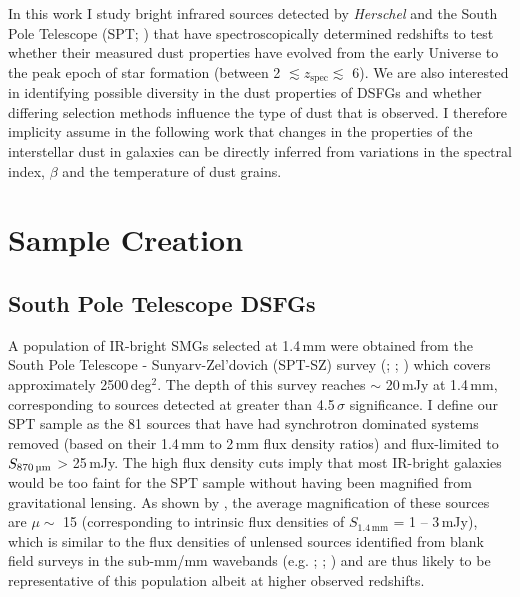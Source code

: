 In this work I study bright infrared sources detected by \textit{Herschel} and the South Pole Telescope (SPT; \citealt{Carlstrom_2011}) that have spectroscopically determined redshifts to test whether their measured dust properties have evolved from the early Universe to the peak epoch of star formation (between 2 $\lesssim z_{\textrm{spec}} \lesssim$ 6). We are also interested in identifying possible diversity in the dust properties of DSFGs and whether differing selection methods influence the type of dust that is observed. I therefore implicity assume in the following work that changes in the properties of the interstellar dust in galaxies can be directly inferred from variations in the spectral index, $\beta$ and the temperature of dust grains.

\section{Sample Creation}
\subsection{South Pole Telescope DSFGs}

A population of IR-bright SMGs selected at 1.4\,mm were obtained from the South Pole Telescope - Sunyarv-Zel'dovich (SPT-SZ) survey (\citealt{Vieira_2010}; \citealt{Mocanu_2013}; \citealt{Everett_2020}) which covers approximately 2500\,deg$^2$. The depth of this survey reaches $\sim$ 20\,mJy at 1.4\,mm, corresponding to sources detected at greater than 4.5\,$\sigma$ significance. I define our SPT sample as the 81 sources that have had synchrotron dominated systems removed (based on their 1.4\,mm to 2\,mm flux density ratios) and flux-limited to $S_{\textrm{870\,\micron}}$ > 25\,mJy. The high flux density cuts imply that most IR-bright galaxies would be too faint for the SPT sample without having been magnified from gravitational lensing. As shown by \citealt{Weiss_2013}, the average magnification of these sources are $\mu \sim$ 15 (corresponding to intrinsic flux densities of $S_{1.4\,\textrm{mm}}$ = 1 -- 3\,mJy), which is similar to the flux densities of unlensed sources identified from blank field surveys in the sub-mm/mm wavebands (e.g. \citealt{Coppin_2006}; \citealt{Pope_2006}; \citealt{Weiss_2009}) and are thus likely to be representative of this population albeit at higher observed redshifts.

